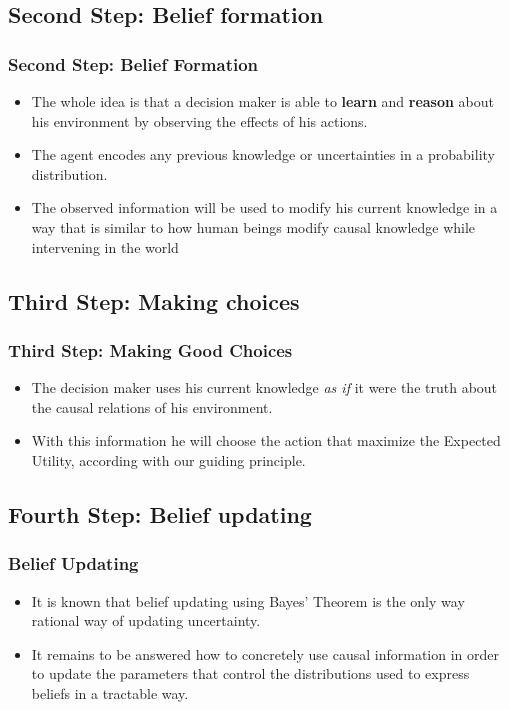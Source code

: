 \documentclass{beamer}
\theoremstyle{plain}
\begin{document}
\subsection{Second Step: Belief formation}
\begin{frame}
\frametitle{Second Step: Belief Formation}
\begin{itemize}
\item The whole idea is that a decision maker is able to \textbf{learn} and \textbf{reason} about his environment by observing the effects of his actions.
\item The agent encodes any previous knowledge or uncertainties in a probability distribution.
\item The observed information will be used to modify his current knowledge in a way that is similar to how human beings modify causal knowledge while intervening in the world
\end{itemize}
\end{frame}

\subsection{Third Step: Making choices}
\begin{frame}
\frametitle{Third Step: Making Good Choices}
\begin{itemize}
\item The decision maker uses his current knowledge \textit{as if} it were the truth about the causal relations of his environment.
\item With this information he will choose the action that maximize the Expected Utility, according with our guiding principle.
\end{itemize}
\end{frame}

\subsection{Fourth Step: Belief updating}
\begin{frame}
\frametitle{Belief Updating}
\begin{itemize}
\item It is known that belief updating using Bayes' Theorem is the only way rational way of updating uncertainty.
\item It remains to be answered how to concretely use causal information in order to update the parameters that control the distributions used to express beliefs in a tractable way.
\end{itemize}
\end{frame}
\end{document}
